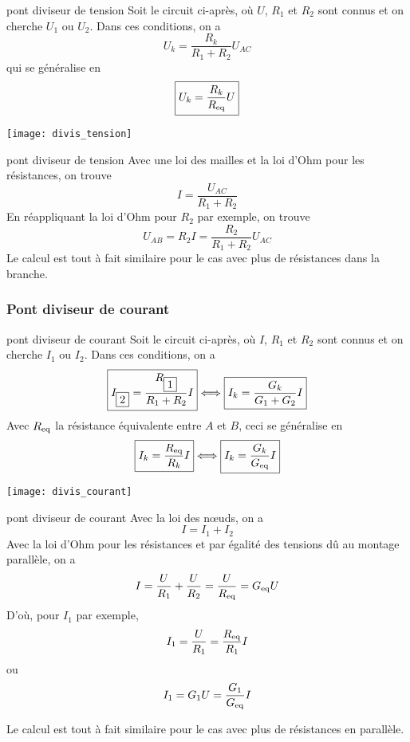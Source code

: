 \documentclass[../main/main.tex]{subfiles}
\begin{document}
\begin{tcbraster}[raster columns=2, raster equal height=rows]
    \begin{prop}[label=prop:divtens, sidebyside]{pont diviseur de tension}
        Soit le circuit ci-après, où $U$, $R_1$ et $R_2$ sont connus et on
        cherche $U_1$ ou $U_2$. Dans ces conditions, on a
        \[ \boxed{U_k = \frac{R_k}{R_1+R_2}U_{AC}}\]
        qui se généralise en
        \[ \boxed{U_k = \frac{R_k}{R_{\rm eq}}U}\]
        \tcblower
        \begin{center}
            \texttt{[image: divis\_tension]}
        \end{center}
    \end{prop}
    \begin{demo}[label=demo:divtens]{pont diviseur de tension}
        Avec une loi des mailles et la loi d'Ohm pour les résistances, on trouve
        \[ I = \frac{U_{AC}}{R_1+R_2}\]
        En réappliquant la loi d'Ohm pour $R_2$ par exemple, on trouve
        \[ U_{AB} = R_2I = \frac{R_2}{R_1+R_2}U_{AC} \]
        Le calcul est tout à fait similaire pour le cas avec plus de résistances
        dans la branche.
    \end{demo}
\end{tcbraster}

\subsubsection{Pont diviseur de courant}

\begin{tcbraster}[raster columns=2, raster equal height=rows]
    \begin{prop}[label=prop:divcour]{pont diviseur de courant}
        Soit le circuit ci-après, où $I$, $R_1$ et $R_2$ sont connus et on
        cherche $I_1$ ou $I_2$. Dans ces conditions, on a
        \[ \boxed{I_{\fbox{2}} = \frac{R_{\fbox{1}}}{R_1+R_2}I}
        \Longleftrightarrow \boxed{I_k = \frac{G_k}{G_1+G_2}I}\]
        Avec $R_{\rm eq}$ la résistance équivalente entre $A$ et $B$, ceci se
        généralise en
        \[ \boxed{I_k = \frac{R_{\rm eq}}{R_k}I}
        \Longleftrightarrow \boxed{I_k = \frac{G_k}{G_{\rm eq}}I}\]
        \tcblower
        \begin{center}
            \texttt{[image: divis\_courant]}
        \end{center}
    \end{prop}
    \begin{demo}[label=demo:divcour]{pont diviseur de courant}
        Avec la loi des nœuds, on a
        \[I = I_1 + I_2\]
        Avec la loi d'Ohm pour les résistances et par égalité des tensions dû au
        montage parallèle, on a
        \[I = \frac{U}{R_1} + \frac{U}{R_2} = \frac{U}{R_{\rm eq}} = G_{\rm eq}U\]
        D'où, pour $I_1$ par exemple,
        \[I_1 = \frac{U}{R_1} = \frac{R_{\rm eq}}{R_1}I\]
        ou
        \[I_1 = G_1 U = \frac{G_1}{G_{\rm eq}}I\]

        Le calcul est tout à fait similaire pour le cas avec plus de résistances
        en parallèle.
    \end{demo}
\end{tcbraster}
\end{document}

